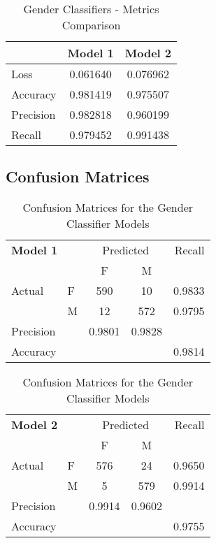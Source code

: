 \documentclass[11pt, letterpaper]{article}
\begin{document}
\begin{table}[h]
\begin{center}
\caption{Gender Classifiers - Metrics Comparison}
\begin{tabular}{l c c}
& 	Model 1 & Model 2 \\ \hline
Loss	&0.061640 & 0.076962 \\
Accuracy& 0.981419 & 0.975507 \\
Precision & 0.982818 & 0.960199 \\
Recall & 0.979452 & 0.991438 \\
\end{tabular}
\label{tab:GenMetricsSum}
\end{center}
\end{table} 

\subsection{Confusion Matrices}


\begin{table}[h!]
\begin{center}
\caption{Confusion Matrices for the Gender Classifier Models}
\begin{tabular}{l l | c c r }
\multicolumn{2}{l}{\textbf{Model 1}} & \multicolumn{2}{c}{Predicted} & Recall \\
& & F & M &  \\ 
\cline{2-5}
Actual & F & 590 &  10 & 0.9833 \\
& M & 12 & 572 & 0.9795 \\  \hline
Precision&  & 0.9801 & 0.9828 \\ 
Accuracy & & &  & 0.9814 \\
\end{tabular}
\begin{tabular}{l l | c c r }
\multicolumn{2}{l}{\textbf{Model 2}} & \multicolumn{2}{c}{Predicted} & Recall \\
& & F& M &  \\ 
\cline{2-5}
Actual & F & 576 &  24 & 0.9650 \\
& M & 5 & 579 & 0.9914 \\  \hline
Precision&  & 0.9914 & 0.9602 \\ 
Accuracy & & &  & 0.9755 \\
\end{tabular}
\label{tab:GenConfusion}
\end{center}
\end{table} 
\end{document}
